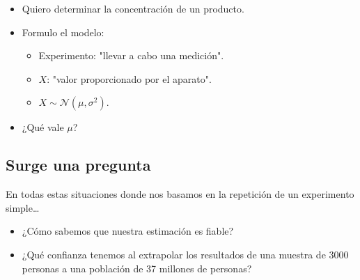 \begin{tcolorbox}[colback=blue!5!white, colframe=blue!75!black, title=\textbf{Determinación de la concentración de un producto}]
\begin{itemize}[label=\textbullet]
    \item Quiero determinar la concentración de un producto.
    \item Formulo el modelo:
        \begin{itemize}[label=\textrightarrow]
            \item Experimento: "llevar a cabo una medición".
            \item $X$: "valor proporcionado por el aparato".
            \item  $X\sim \mathcal{N}(\mu,\sigma^2)$.
        \end{itemize}
    \item ¿Qué vale $\mu$?
\end{itemize}
\end{tcolorbox}
\subsection{Surge una pregunta}
En todas estas situaciones donde nos basamos en la repetición de un experimento simple\dots
\begin{itemize}[label=\textbullet]
    \item ¿Cómo sabemos que nuestra estimación es fiable?
    \item ¿Qué confianza tenemos al extrapolar los resultados de una muestra de 3000 personas a una población de 37 millones de personas?
\end{itemize}
